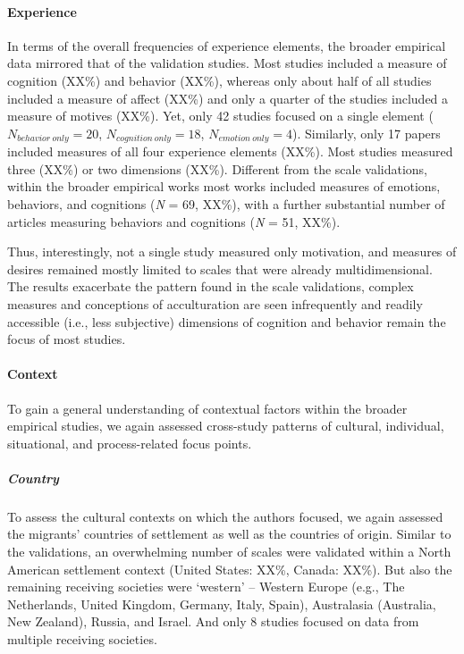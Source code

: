 \documentclass[man, 12pt, a4paper]{apa7}
\begin{document}
\paragraph{Experience}
In terms of the overall frequencies of experience elements, the broader empirical data mirrored that of the validation studies. Most studies included a measure of cognition (XX\%) and behavior (XX\%), whereas only about half of all studies included a measure of affect (XX\%) and only a quarter of the studies included a measure of motives (XX\%). Yet, only 42 studies focused on a single element ($N_{behavior\ only} = 20$,  $N_{cognition\ only} = 18$, $N_{emotion\ only} = 4$). Similarly, only 17 papers included measures of all four experience elements (XX\%). Most studies measured three (XX\%) or two dimensions (XX\%). Different from the scale validations, within the broader empirical works most works included measures of emotions, behaviors, and cognitions (\textit{N} = 69, XX\%), with a further substantial number of articles measuring behaviors and cognitions (\textit{N} = 51, XX\%). 

Thus, interestingly, not a single study measured only motivation, and measures of desires remained mostly limited to scales that were already multidimensional. The results exacerbate the pattern found in the scale validations, complex measures and conceptions of acculturation are seen infrequently and readily accessible (i.e., less subjective) dimensions of cognition and behavior remain the focus of most studies.

\vspace{1em}

\paragraph{Context}
To gain a general understanding of contextual factors within the broader empirical studies, we again assessed cross-study patterns of cultural, individual, situational, and process-related focus points.

\subparagraph{Country}
To assess the cultural contexts on which the authors focused, we again assessed the migrants' countries of settlement as well as the countries of origin. Similar to the validations, an overwhelming number of scales were validated within a North American settlement context (United States: XX\%, Canada: XX\%). But also the remaining receiving societies were `western' -- Western Europe (e.g., The Netherlands, United Kingdom, Germany, Italy, Spain), Australasia (Australia, New Zealand), Russia, and Israel. And only 8 studies focused on data from multiple receiving societies. 
\end{document}
